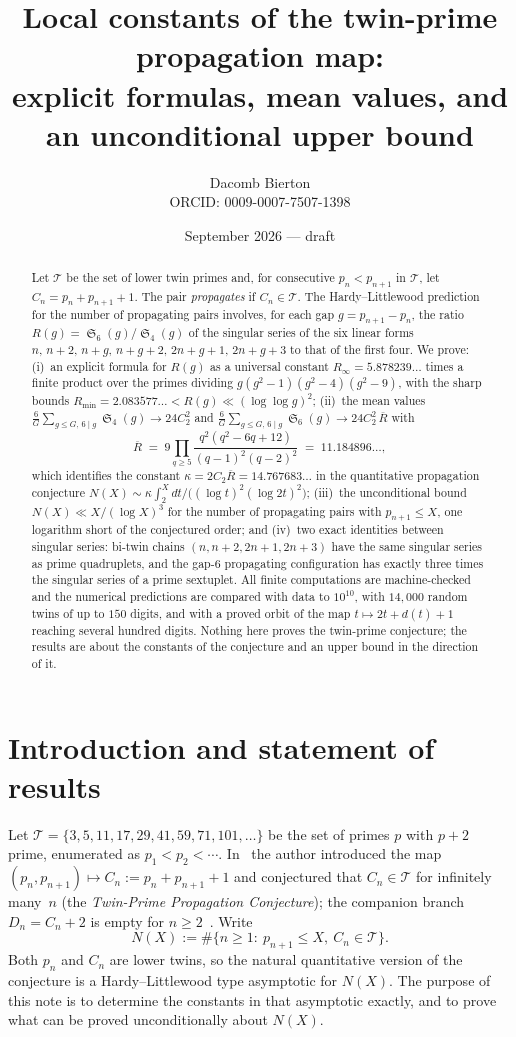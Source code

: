 \documentclass[11pt,a4paper]{article}
\title{\textbf{Local constants of the twin-prime propagation map:\\
explicit formulas, mean values, and an unconditional upper bound}}
\author{Dacomb Bierton\\[4pt]
{\normalsize ORCID: 0009-0007-7507-1398}}
\date{September 2026 --- draft}
\theoremstyle{plain}
\theoremstyle{definition}
\theoremstyle{remark}
\newcommand{\Tset}{\mathcal{T}}
\newcommand{\Rbar}{\overline{R}}
\newcommand{\Rinf}{R_{\infty}}
\newcommand{\Rmin}{R_{\min}}
\DeclareMathOperator{\Sing}{\mathfrak S}
\begin{document}
\maketitle

\begin{abstract}
Let $\Tset$ be the set of lower twin primes and, for consecutive $p_n<p_{n+1}$
in $\Tset$, let $C_n=p_n+p_{n+1}+1$.  The pair \emph{propagates} if
$C_n\in\Tset$.  The Hardy--Littlewood prediction for the number of
propagating pairs involves, for each gap $g=p_{n+1}-p_n$, the ratio
$R(g)=\Sing_6(g)/\Sing_4(g)$ of the singular series of the six linear forms
$n,\,n+2,\,n+g,\,n+g+2,\,2n+g+1,\,2n+g+3$ to that of the first four.
We prove: (i)~an explicit formula for $R(g)$ as a universal constant
$\Rinf=5.878239\ldots$ times a finite product over the primes dividing
$g(g^2-1)(g^2-4)(g^2-9)$, with the sharp bounds
$\Rmin=2.083577\ldots<R(g)\ll(\log\log g)^2$; (ii)~the mean values
$\frac6G\sum_{g\le G,\,6\mid g}\Sing_4(g)\to 24C_2^2$ and
$\frac6G\sum_{g\le G,\,6\mid g}\Sing_6(g)\to 24C_2^2\,\Rbar$ with
\[
\Rbar \;=\; 9\prod_{q\ge 5}\frac{q^2(q^2-6q+12)}{(q-1)^2(q-2)^2}
\;=\;11.184896\ldots,
\]
which identifies the constant $\kappa=2C_2\Rbar=14.767683\ldots$ in the
quantitative propagation conjecture $N(X)\sim\kappa\int_2^X
dt/\bigl((\log t)^2(\log 2t)^2\bigr)$; (iii)~the unconditional bound
$N(X)\ll X/(\log X)^3$ for the number of propagating pairs with
$p_{n+1}\le X$, one logarithm short of the conjectured order; and (iv)~two
exact identities between singular series: bi-twin chains
$(n,n+2,2n+1,2n+3)$ have the same singular series as prime quadruplets, and
the gap-$6$ propagating configuration has exactly three times the singular
series of a prime sextuplet.  All finite computations are machine-checked
and the numerical predictions are compared with data to $10^{10}$, with $14{,}000$ random twins of up to $150$ digits, and with a proved orbit of the map $t\mapsto2t+d(t)+1$ reaching several hundred digits.
Nothing here proves the twin-prime conjecture; the results are about the
constants of the conjecture and an upper bound in the direction of it.
\end{abstract}

\tableofcontents

\section{Introduction and statement of results}

Let $\Tset=\{3,5,11,17,29,41,59,71,101,\dots\}$ be the set of primes $p$
with $p+2$ prime, enumerated as $p_1<p_2<\cdots$.  In~\cite{BiertonProp}
the author introduced the map $(p_n,p_{n+1})\mapsto C_n:=p_n+p_{n+1}+1$
and conjectured that $C_n\in\Tset$ for infinitely many~$n$
(the \emph{Twin-Prime Propagation Conjecture}); the companion branch
$D_n=C_n+2$ is empty for $n\ge2$~\cite{BiertonThm}.  Write
\[
N(X):=\#\{n\ge1:\ p_{n+1}\le X,\ C_n\in\Tset\}.
\]
Both $p_n$ and $C_n$ are lower twins, so the natural
quantitative version of the conjecture is a Hardy--Littlewood type
asymptotic for $N(X)$.  The purpose of this note is to determine the
constants in that asymptotic exactly, and to prove what can be proved
unconditionally about $N(X)$.
\end{document}
